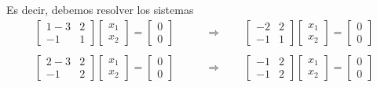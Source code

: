 \documentclass[handout]{beamer} %
\begin{document}
\begin{frame}
    Es decir,  debemos resolver los sistemas
    \begin{align*}
        \begin{bmatrix}
            1-3&2 \\ -1&1
        \end{bmatrix}
        \begin{bmatrix}
            x_1\\x_2
        \end{bmatrix}
        =
        \begin{bmatrix}
            0\\0
        \end{bmatrix}
        \qquad &\Rightarrow \qquad 
        \begin{bmatrix} -2&2 \\ -1&1 \end{bmatrix}
        \begin{bmatrix}
            x_1\\x_2
        \end{bmatrix}
        =
        \begin{bmatrix}
            0\\0
        \end{bmatrix} \tag{S1}
        \\
        &
        \\
        \begin{bmatrix}
            2-3&2 \\ -1&2
        \end{bmatrix}
        \begin{bmatrix}
            x_1\\x_2
        \end{bmatrix}
        =
        \begin{bmatrix}
            0\\0
        \end{bmatrix}
        \qquad &\Rightarrow \qquad 
        \begin{bmatrix}-1&2 \\ -1&2\end{bmatrix}
        \begin{bmatrix}
            x_1\\x_2
        \end{bmatrix}
        =
        \begin{bmatrix}
            0\\0
        \end{bmatrix} \tag{S2}

\end{align*}
\end{frame}
\end{document}
